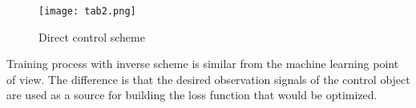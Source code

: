 \documentclass{article}
\begin{document}
\begin{minipage}[t]{0.45\textwidth}
\begin{figure}[H]
\centering
\begin{minipage}[t]{0.4\textwidth}
  \centering
  \hspace*{-2.4cm}\texttt{[image: tab2.png]}
  \captionsetup{justification=centering, font=small}
  \caption{Direct control scheme}\label{fig:myfigure}
\end{minipage}%
\end{figure}

    \hspace{0.2cm} Training process with inverse scheme is similar from the machine learning point of view. The difference is that the desired observation signals of the control object are used as a source for building the loss function that would be optimized.

\end{minipage}
\hspace{0.2cm} 
\end{document}
